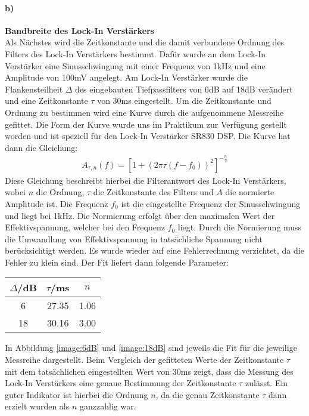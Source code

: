 \paragraph{b)}\textbf{Bandbreite des Lock-In Verstärkers}\\
Als Nächstes wird die Zeitkonstante und die damit verbundene Ordnung des Filters des Lock-In Verstärkers bestimmt. Dafür wurde an dem Lock-In Verstärker eine Sinusschwingung mit einer Frequenz von 1kHz und eine Amplitude von 100mV angelegt. Am Lock-In Verstärker wurde die Flankensteilheit $\Delta$ des eingebauten Tiefpassfilters von 6dB auf 18dB verändert und eine Zeitkonstante $\tau$ von 30ms eingestellt. Um die Zeitkonstante und Ordnung zu bestimmen wird eine Kurve durch die aufgenommene Messreihe gefittet. Die Form der Kurve wurde uns im Praktikum zur Verfügung gestellt worden und ist speziell für den Lock-In Verstärker SR830 DSP. Die Kurve hat dann die Gleichung:
\begin{gather}
    A_{\tau,n}(f) = \left[1 + (2\pi\tau(f-f_0))^2\right]^{-\frac{n}{2}}
\end{gather}
Diese Gleichung beschreibt hierbei die Filterantwort des Lock-In Verstärkers, wobei \newline $n$ die Ordnung, $\tau$ die Zeitkonstante des Filters und $A$ die normierte Amplitude ist. Die Frequenz $f_0$ ist die eingestellte Frequenz der Sinusschwingung und liegt bei 1kHz. Die Normierung erfolgt über den maximalen Wert der Effektivspannung, welcher bei den Frequenz $f_0$ liegt. Durch die Normierung muss die Umwandlung von Effektivspannung in tatsächliche Spannung nicht berücksichtigt werden. Es wurde wieder auf eine Fehlerrechnung verzichtet, da die Fehler zu klein sind. Der Fit liefert dann folgende Parameter:
\begin{center}
    \begin{tabular}{c | c c}
        $\Delta$/dB & $\tau$/ms & $n$\\
        \hline
        6 & 27.35 & 1.06 \\
        18 & 30.16 & 3.00 \\
    \end{tabular}
    \label{tab:fitPara}
\end{center}
In Abbildung \ref{image:6dB} und \ref{image:18dB} sind jeweils die Fit für die jeweilige Messreihe dargestellt. Beim Vergleich der gefitteten Werte der Zeitkonstante $\tau$ mit dem tatsächlichen eingestellten Wert von 30ms zeigt, dass die Messung des Lock-In Verstärkers eine genaue Bestimmung der Zeitkonstante $\tau$ zulässt. Ein guter Indikator ist hierbei die Ordnung $n$, da die genau Zeitkonstante $\tau$ dann erzielt wurden als $n$ ganzzahlig war.

